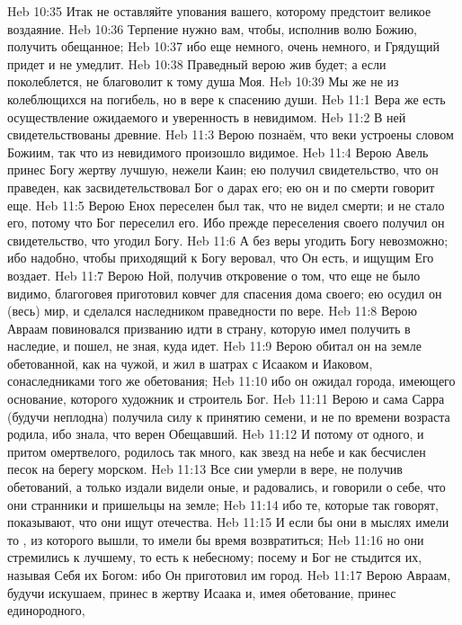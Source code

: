 \vs Heb 10:35 Итак не оставляйте упования вашего, которому предстоит великое воздаяние.
\vs Heb 10:36 Терпение нужно вам, чтобы, исполнив волю Божию, получить обещанное;
\vs Heb 10:37 ибо еще немного, очень немного, и Грядущий придет и не умедлит.
\vs Heb 10:38 Праведный верою жив будет; а если  поколеблется, не благоволит к тому душа Моя.
\vs Heb 10:39 Мы же не из колеблющихся на погибель, но  в вере к спасению души.
\vs Heb 11:1 Вера же есть осуществление ожидаемого и уверенность в невидимом.
\vs Heb 11:2 В ней свидетельствованы древние.
\vs Heb 11:3 Верою познаём, что веки устроены словом Божиим, так что из невидимого произошло видимое.
\vs Heb 11:4 Верою Авель принес Богу жертву лучшую, нежели Каин; ею получил свидетельство, что он праведен, как засвидетельствовал Бог о дарах его; ею он и по смерти говорит еще.
\vs Heb 11:5 Верою Енох переселен был так, что не видел смерти; и не стало его, потому что Бог переселил его. Ибо прежде переселения своего получил он свидетельство, что угодил Богу.
\vs Heb 11:6 А без веры угодить Богу невозможно; ибо надобно, чтобы приходящий к Богу веровал, что Он есть, и ищущим Его воздает.
\vs Heb 11:7 Верою Ной, получив откровение о том, что еще не было видимо, благоговея приготовил ковчег для спасения дома своего; ею осудил он (весь) мир, и сделался наследником праведности по вере.
\vs Heb 11:8 Верою Авраам повиновался призванию идти в страну, которую имел получить в наследие, и пошел, не зная, куда идет.
\vs Heb 11:9 Верою обитал он на земле обетованной, как на чужой, и жил в шатрах с Исааком и Иаковом, сонаследниками того же обетования;
\vs Heb 11:10 ибо он ожидал города, имеющего основание, которого художник и строитель Бог.
\vs Heb 11:11 Верою и сама Сарра (будучи неплодна) получила силу к принятию семени, и не по времени возраста родила, ибо знала, что верен Обещавший.
\vs Heb 11:12 И потому от одного, и притом омертвелого, родилось так много, как  звезд на небе и как бесчислен песок на берегу морском.
\rsbpar\vs Heb 11:13 Все сии умерли в вере, не получив обетований, а только издали видели оные, и радовались, и говорили о себе, что они странники и пришельцы на земле;
\vs Heb 11:14 ибо те, которые так говорят, показывают, что они ищут отечества.
\vs Heb 11:15 И если бы они в мыслях имели то , из которого вышли, то имели бы время возвратиться;
\vs Heb 11:16 но они стремились к лучшему, то есть к небесному; посему и Бог не стыдится их, называя Себя их Богом: ибо Он приготовил им город.
\rsbpar\vs Heb 11:17 Верою Авраам, будучи искушаем, принес в жертву Исаака и, имея обетование, принес единородного,
